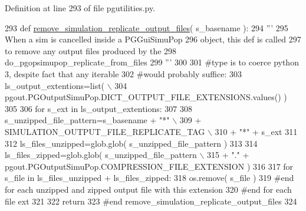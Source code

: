 Definition at line 293 of file pgutilities.\+py.


\begin{DoxyCode}
293 \textcolor{keyword}{def }\hyperlink{namespacenegui_1_1pgutilities_aa37c7d125e4eaec2eeea639f53fa140d}{remove\_simulation\_replicate\_output\_files}( s\_basename ):
294     \textcolor{stringliteral}{'''}
295 \textcolor{stringliteral}{    When a sim is cancelled inside a PGGuiSimuPop}
296 \textcolor{stringliteral}{    object, this def is called}
297 \textcolor{stringliteral}{    to remove any output files produced by the}
298 \textcolor{stringliteral}{    do\_pgopsimupop\_replicate\_from\_files}
299 \textcolor{stringliteral}{    '''}
300 
301     \textcolor{comment}{#type is to coerce python 3, despite fact that any iterable}
302     \textcolor{comment}{#would probably suffice:}
303     ls\_output\_extentions=list( \(\backslash\)
304             pgout.PGOutputSimuPop.DICT\_OUTPUT\_FILE\_EXTENSIONS.values() )
305 
306     \textcolor{keywordflow}{for} s\_ext \textcolor{keywordflow}{in} ls\_output\_extentions:
307 
308         s\_unzipped\_file\_pattern=s\_basename + \textcolor{stringliteral}{"*"} \(\backslash\)
309                 + SIMULATION\_OUTPUT\_FILE\_REPLICATE\_TAG \(\backslash\)
310                 + \textcolor{stringliteral}{"*"} + s\_ext
311 
312         ls\_files\_unzipped=glob.glob( s\_unzipped\_file\_pattern )
313 
314         ls\_files\_zipped=glob.glob( s\_unzipped\_file\_pattern \(\backslash\)
315                 + \textcolor{stringliteral}{"."} + pgout.PGOutputSimuPop.COMPRESSION\_FILE\_EXTENSION )
316 
317         \textcolor{keywordflow}{for} s\_file \textcolor{keywordflow}{in} ls\_files\_unzipped + ls\_files\_zipped:
318             os.remove( s\_file )
319         \textcolor{comment}{#end for each unzipped and zipped output file with this extension}
320     \textcolor{comment}{#end for each file ext}
321 
322     \textcolor{keywordflow}{return}
323 \textcolor{comment}{#end remove\_simulation\_replicate\_output\_files}
324 
\end{DoxyCode}
